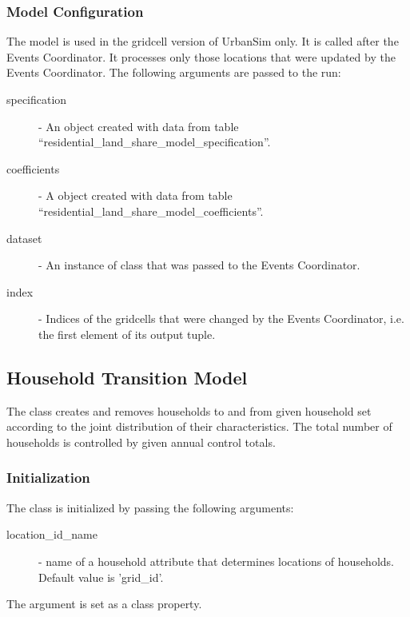 \subsubsection{Model Configuration}
\modelsindex
%
The model is used in the gridcell version of UrbanSim only.
It is called after the Events Coordinator. It processes only those locations 
that were updated by the Events Coordinator.  The following
arguments are passed to the run:
\begin{description}
\item[specification] -  An
 object created with data from table
``residential_land_share_model_specification''. \modelsindex
\item[coefficients] - A  object created
with data from table ``residential_land_share_model_coefficients''. \coefficientsindex\modelsindex
\item[dataset] - An instance of class  that was passed to
  the Events Coordinator.
\item[index] - Indices of the gridcells that were changed by the Events
  Coordinator, i.e. the first element of its output tuple.
\end{description}

%
\subsection{Household Transition Model}
\modelsindex
%
\label{sec:household-transition-model}
 \modelsindex The class  \modelsindex
creates and removes households to and from given household set according to
the joint distribution of their characteristics. The total number of
households is controlled by given annual control totals.

\subsubsection{Initialization}
%
The class is initialized by passing the following arguments:
\begin{description}
\item[location_id_name] - name of a household attribute that determines locations of households.
  Default value is 'grid_id'.
\end{description}
The argument is set as a class property.

